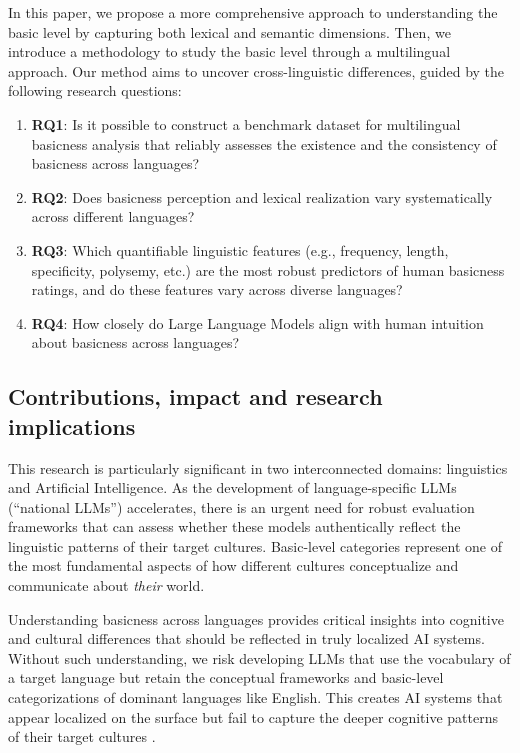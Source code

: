 \documentclass[preprint,12pt,authoryear]{elsarticle}
\begin{document}
In this paper, we propose a more comprehensive approach to understanding the basic level by capturing both lexical and semantic dimensions. Then, we introduce a methodology to study the basic level through a multilingual approach. Our method aims to uncover cross-linguistic differences, guided by the following research questions:

\begin{enumerate}
	\item \textbf{RQ1}: Is it possible to construct a benchmark dataset for multilingual basicness analysis that reliably assesses the existence and the consistency of basicness across languages?
	\item \textbf{RQ2}: Does basicness perception and lexical realization vary systematically across different languages?
    \item \textbf{RQ3}: Which quantifiable linguistic features (e.g., frequency, length, specificity, polysemy, etc.) are the most robust predictors of human basicness ratings, and do these features vary across diverse languages?
	\item \textbf{RQ4}: How closely do Large Language Models align with human intuition about basicness across languages?
    
\end{enumerate}


\subsection{Contributions, impact and research implications}

This research is particularly significant in two interconnected domains: linguistics and Artificial Intelligence. As the development of language-specific LLMs (``national LLMs'') accelerates, there is an urgent need for robust evaluation frameworks that can assess whether these models authentically reflect the linguistic patterns of their target cultures. Basic-level categories represent one of the most fundamental aspects of how different cultures conceptualize and communicate about \emph{their} world.

Understanding basicness across languages provides critical insights into cognitive and cultural differences that should be reflected in truly localized AI systems. Without such understanding, we risk developing LLMs that use the vocabulary of a target language but retain the conceptual frameworks and basic-level categorizations of dominant languages like English. This creates AI systems that appear localized on the surface but fail to capture the deeper cognitive patterns of their target cultures \cite{navigli_biases_2023}.
\end{document}
